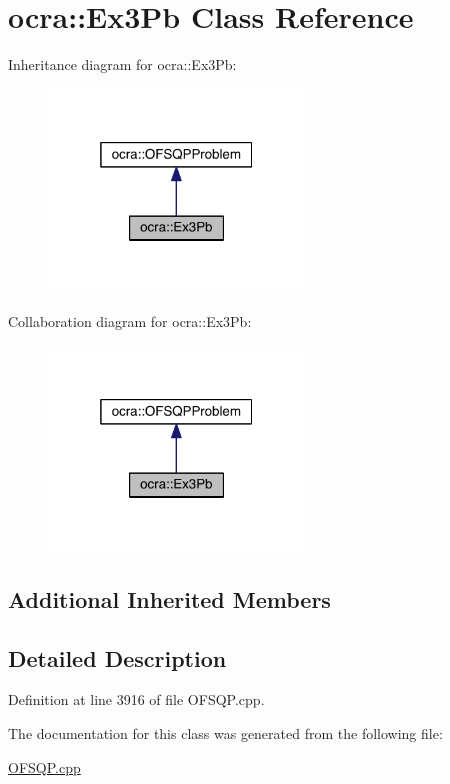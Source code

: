\hypertarget{classocra_1_1Ex3Pb}{}\section{ocra\+:\+:Ex3\+Pb Class Reference}
\label{classocra_1_1Ex3Pb}


Inheritance diagram for ocra\+:\+:Ex3\+Pb\+:\nopagebreak
\begin{figure}[H]
\begin{center}
\leavevmode
\includegraphics[width=193pt]{d5/d4e/classocra_1_1Ex3Pb__inherit__graph}
\end{center}
\end{figure}


Collaboration diagram for ocra\+:\+:Ex3\+Pb\+:\nopagebreak
\begin{figure}[H]
\begin{center}
\leavevmode
\includegraphics[width=193pt]{d2/d8b/classocra_1_1Ex3Pb__coll__graph}
\end{center}
\end{figure}
\subsection*{Additional Inherited Members}


\subsection{Detailed Description}


Definition at line 3916 of file O\+F\+S\+Q\+P.\+cpp.



The documentation for this class was generated from the following file\+:\begin{DoxyCompactItemize}
\item 
\hyperlink{OFSQP_8cpp}{O\+F\+S\+Q\+P.\+cpp}\end{DoxyCompactItemize}
